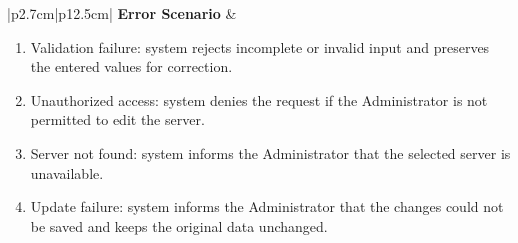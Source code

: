 \begin{table}[H]
\begin{tabular}{|p{2.7cm}|p{12.5cm}|}
        \textbf{Error Scenario} & \begin{minipage}[t]{\linewidth}
                                      \begin{enumerate}[topsep=0pt,itemsep=1pt,parsep=0pt,partopsep=0pt]
                                          \item Validation failure: system rejects incomplete or invalid input and preserves the entered values for correction.
                                          \item Unauthorized access: system denies the request if the Administrator is not permitted to edit the server.
                                          \item Server not found: system informs the Administrator that the selected server is unavailable.
                                          \item Update failure: system informs the Administrator that the changes could not be saved and keeps the original data unchanged.
                                      \end{enumerate}
                                  \end{minipage} \\ \hline
    \end{tabular}
    \label{tab:admin-edit-proxmox}
\end{table}

